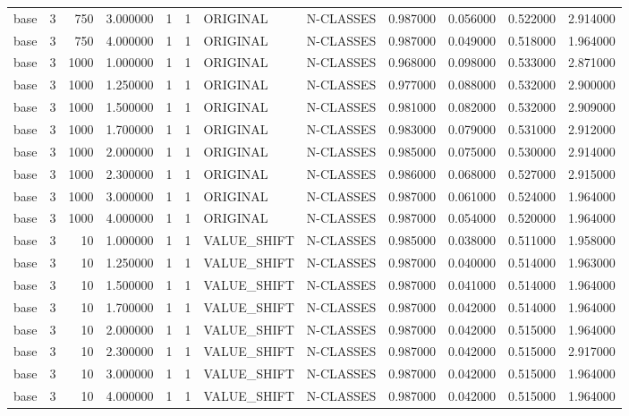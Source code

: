 \begin{tabular}{lrrrllllrrrr}
base & 3 & 750 & 3.000000 & 1 & 1 & ORIGINAL & N-CLASSES & 0.987000 & 0.056000 & 0.522000 & 2.914000 \\
base & 3 & 750 & 4.000000 & 1 & 1 & ORIGINAL & N-CLASSES & 0.987000 & 0.049000 & 0.518000 & 1.964000 \\
base & 3 & 1000 & 1.000000 & 1 & 1 & ORIGINAL & N-CLASSES & 0.968000 & 0.098000 & 0.533000 & 2.871000 \\
base & 3 & 1000 & 1.250000 & 1 & 1 & ORIGINAL & N-CLASSES & 0.977000 & 0.088000 & 0.532000 & 2.900000 \\
base & 3 & 1000 & 1.500000 & 1 & 1 & ORIGINAL & N-CLASSES & 0.981000 & 0.082000 & 0.532000 & 2.909000 \\
base & 3 & 1000 & 1.700000 & 1 & 1 & ORIGINAL & N-CLASSES & 0.983000 & 0.079000 & 0.531000 & 2.912000 \\
base & 3 & 1000 & 2.000000 & 1 & 1 & ORIGINAL & N-CLASSES & 0.985000 & 0.075000 & 0.530000 & 2.914000 \\
base & 3 & 1000 & 2.300000 & 1 & 1 & ORIGINAL & N-CLASSES & 0.986000 & 0.068000 & 0.527000 & 2.915000 \\
base & 3 & 1000 & 3.000000 & 1 & 1 & ORIGINAL & N-CLASSES & 0.987000 & 0.061000 & 0.524000 & 1.964000 \\
base & 3 & 1000 & 4.000000 & 1 & 1 & ORIGINAL & N-CLASSES & 0.987000 & 0.054000 & 0.520000 & 1.964000 \\
base & 3 & 10 & 1.000000 & 1 & 1 & VALUE_SHIFT & N-CLASSES & 0.985000 & 0.038000 & 0.511000 & 1.958000 \\
base & 3 & 10 & 1.250000 & 1 & 1 & VALUE_SHIFT & N-CLASSES & 0.987000 & 0.040000 & 0.514000 & 1.963000 \\
base & 3 & 10 & 1.500000 & 1 & 1 & VALUE_SHIFT & N-CLASSES & 0.987000 & 0.041000 & 0.514000 & 1.964000 \\
base & 3 & 10 & 1.700000 & 1 & 1 & VALUE_SHIFT & N-CLASSES & 0.987000 & 0.042000 & 0.514000 & 1.964000 \\
base & 3 & 10 & 2.000000 & 1 & 1 & VALUE_SHIFT & N-CLASSES & 0.987000 & 0.042000 & 0.515000 & 1.964000 \\
base & 3 & 10 & 2.300000 & 1 & 1 & VALUE_SHIFT & N-CLASSES & 0.987000 & 0.042000 & 0.515000 & 2.917000 \\
base & 3 & 10 & 3.000000 & 1 & 1 & VALUE_SHIFT & N-CLASSES & 0.987000 & 0.042000 & 0.515000 & 1.964000 \\
base & 3 & 10 & 4.000000 & 1 & 1 & VALUE_SHIFT & N-CLASSES & 0.987000 & 0.042000 & 0.515000 & 1.964000 \\

\end{tabular}
